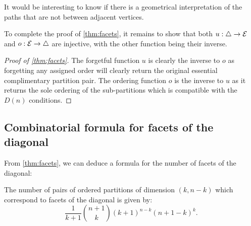 \begin{rem}
    It would be interesting to know if there is a geometrical interpretation of the paths that are not between adjacent vertices. 
\end{rem}

To complete the proof of \cref{thm:facets}, it remains to show that both $u:\triangle \to \mathcal{E}$ and $o:\mathcal{E}\to \triangle$ are injective, with the other function being their inverse.

\begin{proof}[{Proof of \cref{thm:facets}}]
The forgetful function $u$ is clearly the inverse to $o$ as forgetting any assigned order will clearly return the original essential complimentary partition pair. 
The ordering function $o$ is the inverse to $u$ as it returns the sole ordering of the sub-partitions which is compatible with the $D(n)$ conditions.
\end{proof}

\subsection{Combinatorial formula for facets of the diagonal}

From \cref{thm:facets}, we can deduce a formula for the number of facets of the diagonal:

\begin{proposition}
The number of pairs of ordered partitions of dimension $(k,n-k)$ which correspond to facets of the diagonal is given by: 
\begin{equation}
\frac{1}{k+1}\binom{n+1}{k}(k+1)^{n-k}(n+1-k)^{k}.
\end{equation}
\end{proposition}

